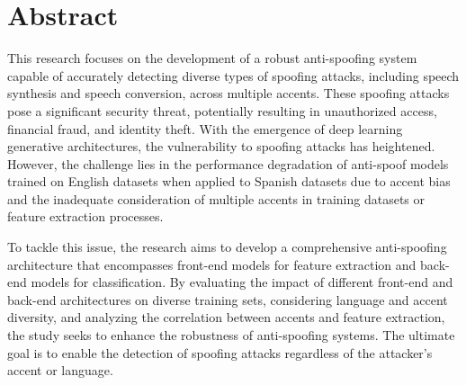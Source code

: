 
\chapter{Abstract}

This research focuses on the development of a robust anti-spoofing system capable of accurately detecting diverse types of spoofing attacks, including speech synthesis and speech conversion, across multiple accents. These spoofing attacks pose a significant security threat, potentially resulting in unauthorized access, financial fraud, and identity theft. With the emergence of deep learning generative architectures, the vulnerability to spoofing attacks has heightened. However, the challenge lies in the performance degradation of anti-spoof models trained on English datasets when applied to Spanish datasets due to accent bias and the inadequate consideration of multiple accents in training datasets or feature extraction processes. 

To tackle this issue, the research aims to develop a comprehensive anti-spoofing architecture that encompasses front-end models for feature extraction and back-end models for classification. By evaluating the impact of different front-end and back-end architectures on diverse training sets, considering language and accent diversity, and analyzing the correlation between accents and feature extraction, the study seeks to enhance the robustness of anti-spoofing systems. The ultimate goal is to enable the detection of spoofing attacks regardless of the attacker's accent or language.


